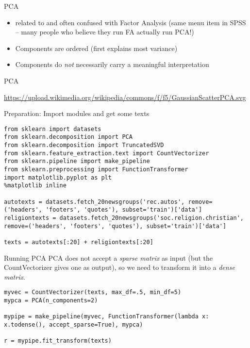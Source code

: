 \begin{frame}{PCA}
\begin{itemize}
\item related to and often confused with Factor Analysis (same menu item in SPSS -- many people who believe they run FA actually run PCA!)
\item Components are ordered (first explains most variance)
\item Components do \emph{not} necessarily carry a meaningful interpretation
\end{itemize}
\end{frame}

\begin{frame}{PCA}

\tiny{\url{https://upload.wikimedia.org/wikipedia/commons/f/f5/GaussianScatterPCA.svg}}
\end{frame}



\begin{frame}{Preparation: Import modules and get some texts}
\begin{lstlisting}
from sklearn import datasets
from sklearn.decomposition import PCA
from sklearn.decomposition import TruncatedSVD
from sklearn.feature_extraction.text import CountVectorizer
from sklearn.pipeline import make_pipeline
from sklearn.preprocessing import FunctionTransformer
import matplotlib.pyplot as plt
%matplotlib inline

autotexts = datasets.fetch_20newsgroups('rec.autos', remove=('headers', 'footers', 'quotes'), subset='train')['data']
religiontexts = datasets.fetch_20newsgroups('soc.religion.christian', remove=('headers', 'footers', 'quotes'), subset='train')['data']

texts = autotexts[:20] + religiontexts[:20]
\end{lstlisting}
\end{frame}




\begin{frame}{Running PCA}
PCA does not accept a \textit{sparse matrix} as input (but the CountVectorizer gives one as output), so we need to transform it into a \textit{dense matrix}.

\begin{lstlisting}
myvec = CountVectorizer(texts, max_df=.5, min_df=5)
mypca = PCA(n_components=2)

mypipe = make_pipeline(myvec, FunctionTransformer(lambda x: x.todense(), accept_sparse=True), mypca)

r = mypipe.fit_transform(texts)
\end{lstlisting}
\end{frame}



